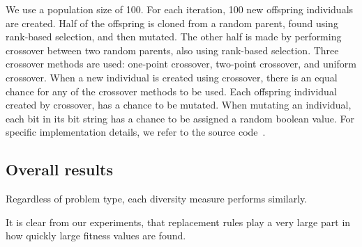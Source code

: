 We use a population size of 100. For each iteration, 100 new offspring individuals are created. Half of the offspring is cloned from a random parent, found using rank-based selection, and then mutated. The other half is made by performing crossover between two random parents, also using rank-based selection. Three crossover methods are used: one-point crossover, two-point crossover, and uniform crossover. When a new individual is created using crossover, there is an equal chance for any of the crossover methods to be used. Each offspring individual created by crossover, has a  chance to be mutated. When mutating an individual, each bit in its bit string has a  chance to be assigned a random boolean value. For specific implementation details, we refer to the source code~\cite{mbm:kmc:ekoGA}.





\subsection{Overall results}
Regardless of problem type, each diversity measure performs similarly.

It is clear from our experiments, that replacement rules play a very large part in how quickly large fitness values are found.
